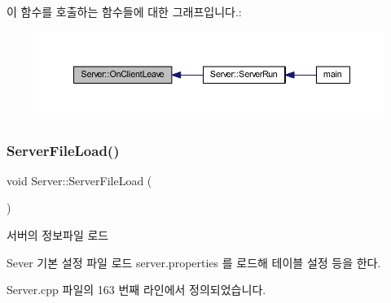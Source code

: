 이 함수를 호출하는 함수들에 대한 그래프입니다.\+:\nopagebreak
\begin{figure}[H]
\begin{center}
\leavevmode
\includegraphics[width=350pt]{class_server_a1249766dc00efcf1f29a2aaad56f83ef_icgraph}
\end{center}
\end{figure}
\mbox{\label{class_server_abfc09109c7050e40d8fc1e3daea76edf}} 
\subsubsection{\texorpdfstring{Server\+File\+Load()}{ServerFileLoad()}}
{\footnotesize\ttfamily void Server\+::\+Server\+File\+Load (\begin{DoxyParamCaption}{ }\end{DoxyParamCaption})}



서버의 정보파일 로드 

Sever 기본 설정 파일 로드  server.\+properties 를 로드해 테이블 설정 등을 한다. 

Server.\+cpp 파일의 163 번째 라인에서 정의되었습니다.


